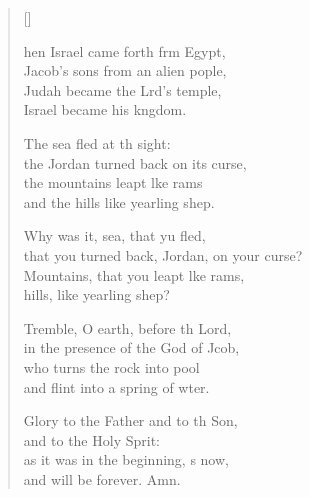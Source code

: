 \settowidth{\versewidth}{that you turned back, Jordan, on your course?}
\begin{verse}[\versewidth]
  \begin{patverse}
hen Israel came forth frm Egypt,\Med\\
Jacob’s sons from an alien pople,\\
Judah became the Lrd’s temple,\Med\\
Israel became his k\pointup{\i}ngdom.

The sea fled at th sight:\Med\\
the Jordan turned back on its curse,\\
the mountains leapt l\pointup{\i}ke rams\Med\\
and the hills like yearling shep.

Why was it, sea, that yu fled,\Med\\
that you turned back, Jordan, on your curse?\\
Mountains, that you leapt l\pointup{\i}ke rams,\Med\\
hills, like yearling shep?

Tremble, O earth, before th Lord,\Med\\
in the presence of the God of Jcob,\\
who turns the rock into  pool\Med\\
and flint into a spring of wter.

Glory to the Father and to th Son,\Med\\
and to the Holy Sp\pointup{\i}rit:\\
as it was in the beginning, \pointup{\i}s now,\Med\\
and will be forever. Amn.
  \end{patverse}
\end{verse}
